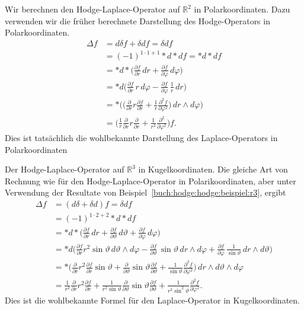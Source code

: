 \begin{beispiel}
Wir berechnen den Hodge-Laplace-Operator auf $\mathbb{R}^2$ in
Polarkoordinaten.
Dazu verwenden wir die früher berechnete Darstellung des Hodge-Operators
in Polarkoordinaten.
\begin{align*}
\Delta f
&=
d\delta f
+
\delta d f
=
\delta d f
\\
&=
(-1)^{1\cdot 1+1}
{\ast}d{\ast}d f
=
{\ast}d{\ast}d f
\\
&=
{\ast}d{\ast}
\biggl(
\frac{\partial f}{\partial r}\,dr
+
\frac{\partial f}{\partial \varphi}\,d\varphi
\biggr)
\\
&=
{\ast}d\biggl(
\frac{\partial f}{\partial r}\,r\,d\varphi
-
\frac{\partial f}{\partial \varphi}\,\frac{1}{r}\,dr
\biggr)
\\
&=
{\ast}
\biggl(
\biggl(
\frac{\partial }{\partial r} r \frac{\partial f}{\partial r}
+
\frac{1}{r}
\frac{\partial^2 f}{\partial\varphi^2}
\biggr)
\,dr\wedge d\varphi
\biggr)
\\
&=
\biggl(
\frac{1}{r}
\frac{\partial}{\partial r} 
r
\frac{\partial}{\partial r}
+
\frac{1}{r^2}
\frac{\partial^2}{\partial \varphi^2}
\biggr)
f.
\end{align*}
Dies ist tatsächlich die wohlbekannte Darstellung des
Laplace-Operators in Polarkoordinaten
\end{beispiel}

\begin{beispiel}
Der Hodge-Laplace-Operator auf $\mathbb{R}^3$ in
Kugelkoordinaten.
Die gleiche Art von Rechnung wie für den Hodge-Laplace-Operator in
Polarikoordinaten, aber unter Verwendung der Resultate von
Beispiel~\ref{buch:hodge:hodge:beispiel:r3}, ergibt 
\begin{align*}
\Delta f
&=
(d\delta + \delta d) f
=
\delta d f
\\
&=
(-1)^{1\cdot 2+2}
{\ast}d{\ast}df
\\
&=
{\ast}d{\ast}\biggl(
\frac{\partial f}{\partial r}\,dr
+
\frac{\partial f}{\partial\vartheta}\,d\vartheta
+
\frac{\partial f}{\partial\varphi}\,d\varphi
\biggr)
\\
&=
{\ast}d\biggl(
\frac{\partial f}{\partial r} r^2\sin\vartheta \, d\vartheta\wedge d\varphi
-
\frac{\partial f}{\partial\vartheta}\,\sin\vartheta\,dr\wedge d\varphi
+
\frac{\partial f}{\partial\varphi}\,\frac{1}{\sin\vartheta}\,dr\wedge d\vartheta
\biggr)
\\
&=
{\ast}
\biggl(
\frac{\partial}{\partial r}r^2\frac{\partial f}{\partial r}
\sin\vartheta
+
\frac{\partial}{\partial \vartheta}
\sin\vartheta
\frac{\partial f}{\partial \vartheta}
+
\frac{1}{\sin\vartheta}
\frac{\partial^2 f}{\partial\varphi^2}
\biggr)
\,dr\wedge d\vartheta\wedge d\varphi
\\
&=
\frac{1}{r^2}
\frac{\partial}{\partial r}r^2\frac{\partial f}{\partial r}
+
\frac{1}{r^2\sin\vartheta}
\frac{\partial}{\partial \vartheta}
\sin\vartheta
\frac{\partial f}{\partial \vartheta}
+
\frac{1}{r^2\sin^2\vartheta}
\frac{\partial^2 f}{\partial \varphi^2}.
\end{align*}
Dies ist die wohlbekannte Formel für den Laplace-Operator in 
Kugelkoordinaten.
\end{beispiel}


